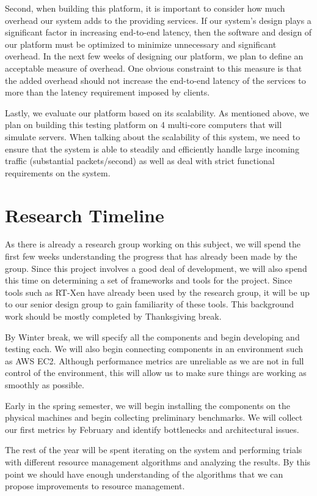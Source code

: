 \documentclass{sig-alternate}
\begin{document}
	Second, when building this platform, it is important to consider how much overhead our system adds to the providing services. If our system’s design plays a significant factor in increasing end-to-end latency, then the software and design of our platform must be optimized to minimize unnecessary and significant overhead. In the next few weeks of designing our platform, we plan to define an acceptable measure of overhead. One obvious constraint to this measure is that the added overhead should not increase the end-to-end latency of the services to more than the latency requirement imposed by clients.

	Lastly, we evaluate our platform based on its scalability. As mentioned above, we plan on building this testing platform on 4 multi-core computers that will simulate servers. When talking about the scalability of this system, we need to ensure that the system is able to steadily and efficiently handle large incoming traffic (substantial packets/second) as well as deal with strict functional requirements on the system.


\section{Research Timeline}
\label{sec:research_timeline}
As there is already a research group working on this subject, we will spend the first few weeks understanding the progress that has already been made by the group. Since this project involves a good deal of development, we will also spend this time on determining a set of frameworks and tools for the project. Since tools such as RT-Xen have already been used by the research group, it will be up to our senior design group to gain familiarity of these tools. This background work should be mostly completed by Thanksgiving break.

By Winter break, we will specify all the components and begin developing and testing each. We will also begin connecting components in an environment such as AWS EC2. Although performance metrics are unreliable as we are not in full control of the environment, this will allow us to make sure things are working as smoothly as possible.

Early in the spring semester, we will begin installing the components on the physical machines and begin collecting preliminary benchmarks. We will collect our first metrics by February and identify bottlenecks and architectural issues.

The rest of the year will be spent iterating on the system and performing trials with different resource management algorithms and analyzing the results. By this point we should have enough understanding of the algorithms that we can propose improvements to resource management.
\end{document}
